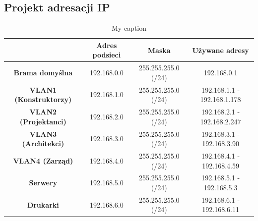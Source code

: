 \documentclass{article}
\begin{document}
\subsection{Projekt adresacji IP}
\begin{table}[H]
	\centering
	\caption{My caption}
	\begin{tabular}{|c|c|c|c|}
		\hline
		& \textbf{Adres podsieci} & \textbf{Maska}      & \textbf{Używane adresy}     \\ \hline
		\textbf{Brama domyślna} & 192.168.0.0             & 255.255.255.0 (/24) & 192.168.0.1                 \\ \hline
		\textbf{VLAN1 (Konstruktorzy)}          & 192.168.1.0             & 255.255.255.0 (/24) & 192.168.1.1 - 192.168.1.178 \\ \hline
		\textbf{VLAN2 (Projektanci)}          & 192.168.2.0             & 255.255.255.0 (/24) & 192.168.2.1 - 192.168.2.247 \\ \hline
		\textbf{VLAN3 (Architekci)}          & 192.168.3.0             & 255.255.255.0 (/24) & 192.168.3.1 - 192.168.3.90  \\ \hline
		\textbf{VLAN4 (Zarząd)}          & 192.168.4.0             & 255.255.255.0 (/24) & 192.168.4.1 - 192.168.4.59  \\ \hline
		\textbf{Serwery}        & 192.168.5.0             & 255.255.255.0 (/24) & 192.168.5.1 - 192.168.5.3   \\ \hline
		\textbf{Drukarki}       & 192.168.6.0             & 255.255.255.0 (/24) & 192.168.6.1 - 192.168.6.11  \\ \hline
	\end{tabular}
\end{table}
%
%
%

\end{document}
